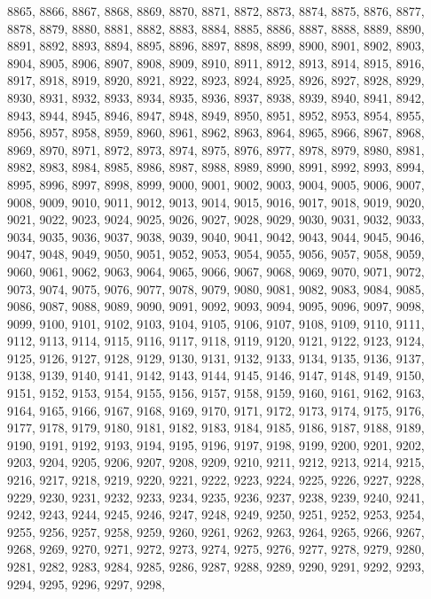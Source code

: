8865,
8866,
8867,
8868,
8869,
8870,
8871,
8872,
8873,
8874,
8875,
8876,
8877,
8878,
8879,
8880,
8881,
8882,
8883,
8884,
8885,
8886,
8887,
8888,
8889,
8890,
8891,
8892,
8893,
8894,
8895,
8896,
8897,
8898,
8899,
8900,
8901,
8902,
8903,
8904,
8905,
8906,
8907,
8908,
8909,
8910,
8911,
8912,
8913,
8914,
8915,
8916,
8917,
8918,
8919,
8920,
8921,
8922,
8923,
8924,
8925,
8926,
8927,
8928,
8929,
8930,
8931,
8932,
8933,
8934,
8935,
8936,
8937,
8938,
8939,
8940,
8941,
8942,
8943,
8944,
8945,
8946,
8947,
8948,
8949,
8950,
8951,
8952,
8953,
8954,
8955,
8956,
8957,
8958,
8959,
8960,
8961,
8962,
8963,
8964,
8965,
8966,
8967,
8968,
8969,
8970,
8971,
8972,
8973,
8974,
8975,
8976,
8977,
8978,
8979,
8980,
8981,
8982,
8983,
8984,
8985,
8986,
8987,
8988,
8989,
8990,
8991,
8992,
8993,
8994,
8995,
8996,
8997,
8998,
8999,
9000,
9001,
9002,
9003,
9004,
9005,
9006,
9007,
9008,
9009,
9010,
9011,
9012,
9013,
9014,
9015,
9016,
9017,
9018,
9019,
9020,
9021,
9022,
9023,
9024,
9025,
9026,
9027,
9028,
9029,
9030,
9031,
9032,
9033,
9034,
9035,
9036,
9037,
9038,
9039,
9040,
9041,
9042,
9043,
9044,
9045,
9046,
9047,
9048,
9049,
9050,
9051,
9052,
9053,
9054,
9055,
9056,
9057,
9058,
9059,
9060,
9061,
9062,
9063,
9064,
9065,
9066,
9067,
9068,
9069,
9070,
9071,
9072,
9073,
9074,
9075,
9076,
9077,
9078,
9079,
9080,
9081,
9082,
9083,
9084,
9085,
9086,
9087,
9088,
9089,
9090,
9091,
9092,
9093,
9094,
9095,
9096,
9097,
9098,
9099,
9100,
9101,
9102,
9103,
9104,
9105,
9106,
9107,
9108,
9109,
9110,
9111,
9112,
9113,
9114,
9115,
9116,
9117,
9118,
9119,
9120,
9121,
9122,
9123,
9124,
9125,
9126,
9127,
9128,
9129,
9130,
9131,
9132,
9133,
9134,
9135,
9136,
9137,
9138,
9139,
9140,
9141,
9142,
9143,
9144,
9145,
9146,
9147,
9148,
9149,
9150,
9151,
9152,
9153,
9154,
9155,
9156,
9157,
9158,
9159,
9160,
9161,
9162,
9163,
9164,
9165,
9166,
9167,
9168,
9169,
9170,
9171,
9172,
9173,
9174,
9175,
9176,
9177,
9178,
9179,
9180,
9181,
9182,
9183,
9184,
9185,
9186,
9187,
9188,
9189,
9190,
9191,
9192,
9193,
9194,
9195,
9196,
9197,
9198,
9199,
9200,
9201,
9202,
9203,
9204,
9205,
9206,
9207,
9208,
9209,
9210,
9211,
9212,
9213,
9214,
9215,
9216,
9217,
9218,
9219,
9220,
9221,
9222,
9223,
9224,
9225,
9226,
9227,
9228,
9229,
9230,
9231,
9232,
9233,
9234,
9235,
9236,
9237,
9238,
9239,
9240,
9241,
9242,
9243,
9244,
9245,
9246,
9247,
9248,
9249,
9250,
9251,
9252,
9253,
9254,
9255,
9256,
9257,
9258,
9259,
9260,
9261,
9262,
9263,
9264,
9265,
9266,
9267,
9268,
9269,
9270,
9271,
9272,
9273,
9274,
9275,
9276,
9277,
9278,
9279,
9280,
9281,
9282,
9283,
9284,
9285,
9286,
9287,
9288,
9289,
9290,
9291,
9292,
9293,
9294,
9295,
9296,
9297,
9298,
